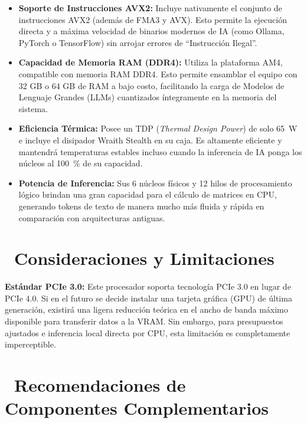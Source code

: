 \documentclass[11pt,a4paper]{article}
\newcommand{\iconotexto}[2]{\textcolor{cyanNeon}{\faIcon{#1}}~#2}
\begin{document}
\begin{itemize}
    \item \textbf{Soporte de Instrucciones AVX2:} Incluye nativamente el conjunto de instrucciones AVX2 (además de FMA3 y AVX). Esto permite la ejecución directa y a máxima velocidad de binarios modernos de IA (como Ollama, PyTorch o TensorFlow) sin arrojar errores de ``Instrucción Ilegal''.
    \item \textbf{Capacidad de Memoria RAM (DDR4):} Utiliza la plataforma AM4, compatible con memoria RAM DDR4. Esto permite ensamblar el equipo con 32 GB o 64 GB de RAM a bajo costo, facilitando la carga de Modelos de Lenguaje Grandes (LLMs) cuantizados íntegramente en la memoria del sistema.
    \item \textbf{Eficiencia Térmica:} Posee un TDP (\textit{Thermal Design Power}) de solo \SI{65}{\watt} e incluye el disipador Wraith Stealth en su caja. Es altamente eficiente y mantendrá temperaturas estables incluso cuando la inferencia de IA ponga los núcleos al \SI{100}{\percent} de su capacidad.
    \item \textbf{Potencia de Inferencia:} Sus 6 núcleos físicos y 12 hilos de procesamiento lógico brindan una gran capacidad para el cálculo de matrices en CPU, generando tokens de texto de manera mucho más fluida y rápida en comparación con arquitecturas antiguas.
\end{itemize}

\section[Consideraciones y Limitaciones]{\iconotexto{exclamation-triangle}{Consideraciones y Limitaciones}}

\begin{tcolorbox}[cajaMejora, title={\faIcon{exclamation-circle}~Limitación a tener en cuenta}]
\textbf{Estándar PCIe 3.0:} Este procesador soporta tecnología PCIe 3.0 en lugar de PCIe 4.0. Si en el futuro se decide instalar una tarjeta gráfica (GPU) de última generación, existirá una ligera reducción teórica en el ancho de banda máximo disponible para transferir datos a la VRAM. Sin embargo, para presupuestos ajustados e inferencia local directa por CPU, esta limitación es completamente imperceptible.
\end{tcolorbox}

\section[Recomendaciones de Componentes Complementarios]{\iconotexto{tools}{Recomendaciones de Componentes Complementarios}}
\end{document}
